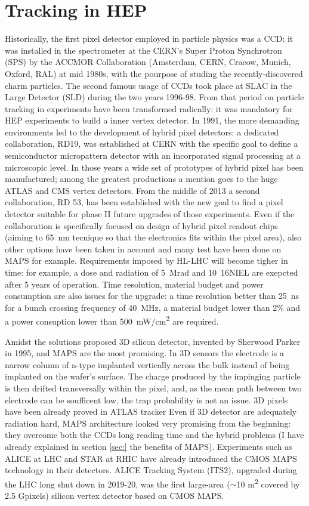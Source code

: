 \section{Tracking in HEP}
    Historically, the first pixel detector employed in particle physics was a CCD: it was installed in the spectrometer at the CERN’s Super Proton Synchrotron (SPS) by the ACCMOR Collaboration (Amsterdam, CERN, Cracow, Munich, Oxford, RAL) at mid 1980s, with the pourpose of studing the recently-discovered charm particles.
    The second famous usage of CCDs took place at SLAC in the Large Detector (SLD) during the two years 1996-98. From that period on particle tracking in experiments have been transformed radically: it was mandatory for HEP experiments to build a inner vertex detector. 
    In 1991, the more demanding environments led to the development of hybrid pixel detectors: a dedicated collaboration, RD19, was established at CERN with the specific goal to define a semiconductor micropattern detector with an incorporated signal processing at a microscopic level. 
    In those years a wide set of prototypes of hybrid pixel has been manufactured; among the greatest productions a mention goes to the huge ATLAS and CMS vertex detectors. 
    From the middle of 2013 a second collaboration, RD 53, has been established with the new goal to find a pixel detector suitable for phase II future upgrades of those experiments. Even if the collaboration is specifically focused on design of hybrid pixel readout chips (aiming to \SI{65}{nm} tecnique so that the electronics fits within the pixel area), also other options have been taken in account and many test have been done on MAPS for example. Requirements imposed by HL-LHC will become tigher in time: for example, a dose and radiation of \SI{5}{Mrad} and \si{10 {16}}{NIEL} are exepcted after 5 years of operation. Time resolution, material budget and power consumption are also issues for the upgrade: a time resolution better than \SI{25}{ns} for a bunch crossing frequency of \SI{40}{MHz}, a material budget lower than 2\% and a power consuption lower than  \SI{500}{mW/cm\squared} are required. 

    Amidst the solutions proposed 3D silicon detector, invented by Sherwood Parker in 1995, and MAPS are the most promising. In 3D sensors the electrode is a narrow column of n-type implanted vertically across the bulk instead of being implanted on the wafer's surface. 
    The charge produced by the impinging particle is then drifted transversally within the pixel, and, as the mean path between two electrode can be soufficent low, the trap probability is not an issue. 
    3D pixels have been already proved in ATLAS tracker  
    Even if 3D detector are adequately radiation hard, MAPS architecture looked very promising from the beginning: they overcome both the CCDs long reading time and the hybrid problems (I have already explained in section \ref{sec:} the benefits of MAPS). 
    Experiments such as ALICE at LHC and STAR at RHIC have already introduced the CMOS MAPS technology in their detectors. ALICE Tracking System (ITS2), upgraded during the LHC long shut down in 2019-20, was the first large-area ($\sim$10 \si{m\squared} covered by 2.5 Gpixels) silicon vertex detector based on CMOS MAPS.

